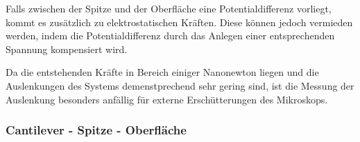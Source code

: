           Falls zwischen der Spitze und der Oberfläche eine Potentialdifferenz vorliegt, kommt es zusätzlich zu elektrostatischen Kräften. Diese können jedoch vermieden werden, indem die Potentialdifferenz durch
          das Anlegen einer entsprechenden Spannung kompensiert wird.\newline

          Da die entstehenden Kräfte in Bereich einiger Nanonewton liegen und die Auslenkungen des Systems demenstprechend sehr gering sind, ist die Messung der Auslenkung besonders anfällig für externe Erschütterungen des Mikroskops.
          
        \newpage
        \subsubsection{Cantilever - Spitze - Oberfläche}

          \FloatBarrier

